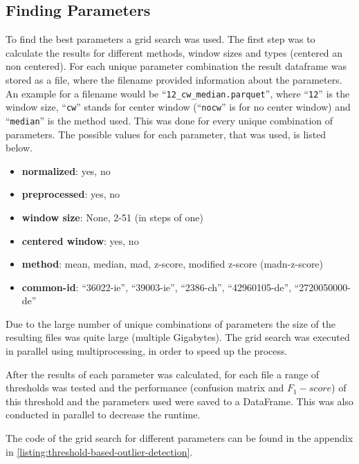 \subsection{Finding Parameters}
To find the best parameters a grid search was used. The first step was to calculate the results for different methods, window sizes and types (centered an non centered). For each unique parameter combination the result dataframe was stored as a file, where the filename provided information about the parameters. An example for a filename would be ``\verb|12_cw_median.parquet|'', where ``\verb|12|'' is the window size, ``\verb|cw|'' stands for center window (``\verb|nocw|'' is for no center window) and ``\verb|median|'' is the method used. This was done for every unique combination of parameters. The possible values for each parameter, that was used, is listed below.
\begin{itemize}
    \item \textbf{normalized}: yes, no
    \item \textbf{preprocessed}: yes, no 
    \item \textbf{window size}: None, 2-51 (in steps of one)
    \item \textbf{centered window}: yes, no
    \item \textbf{method}: mean, median, mad, z-score, modified z-score (madn-z-score)
    \item \textbf{common-id}: ``36022-ie'', ``39003-ie'', ``2386-ch'', ``42960105-de'', ``2720050000-de''
\end{itemize}
Due to the large number of unique combinations of parameters the size of the resulting files was quite large (multiple Gigabytes). The grid search was executed in parallel using multiprocessing, in order to speed up the process.
\par
After the results of each parameter was calculated, for each file a range of thresholds was tested and the performance (confusion matrix and $F_1-score$) of this threshold and the parameters used were saved to a DataFrame. This was also conducted in parallel to decrease the runtime.
\par
The code of the grid search for different parameters can be found in the appendix in \autoref{listing:threshold-based-outlier-detection}.

